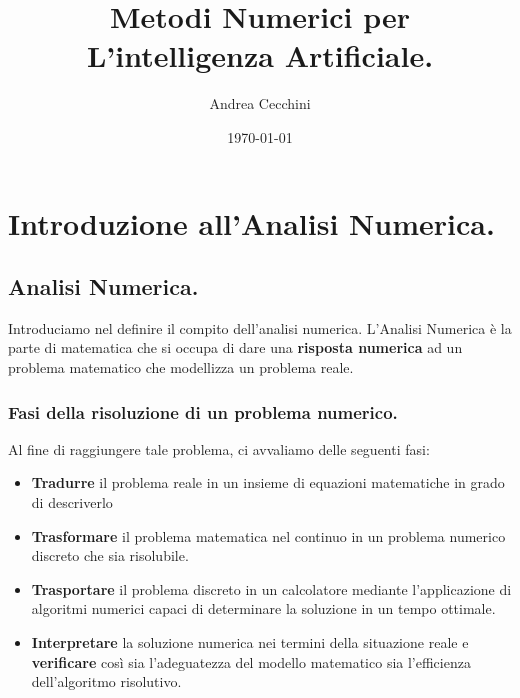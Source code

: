 
\author{Andrea Cecchini}
\title{\textbf{Metodi Numerici per \\ L'intelligenza Artificiale.}}
\date{\today}

\maketitle
\newpage
\tableofcontents
\newpage
\section{Introduzione all'Analisi Numerica.}
\subsection{Analisi Numerica.}
Introduciamo nel definire il compito dell'analisi numerica.
%
{
    L'Analisi Numerica è la parte di matematica 
    che si occupa di dare una \textbf{risposta numerica} 
    ad un problema matematico  che modellizza un problema reale.    
}
\subsubsection{Fasi della risoluzione di un problema numerico.}
%
Al fine di raggiungere tale problema, ci avvaliamo delle seguenti fasi:
%
\begin{itemize}
    \item \textbf{Tradurre} il problema reale in un insieme di equazioni 
%
    matematiche in grado di descriverlo
    \item \textbf{Trasformare} il problema matematica nel continuo in un 
%
    problema numerico discreto che sia risolubile.
    \item \textbf{Trasportare}  il problema discreto in un calcolatore mediante 
%
    l’applicazione di algoritmi numerici capaci di determinare la soluzione 
%
    in un tempo ottimale.
    \item \textbf{Interpretare} la soluzione numerica nei termini 
%
    della situazione reale e \textbf{verificare} così sia l’adeguatezza del modello 
%
    matematico sia l’efficienza dell’algoritmo risolutivo.
\end{itemize}
